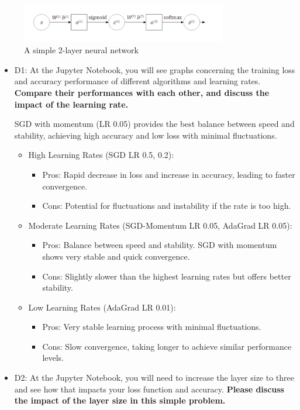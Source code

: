 \documentclass[12pt]{article}
\begin{document}
\begin{figure}[hbt]
	\centering
	\includegraphics[width=0.8\textwidth]{q3.png}
	\caption{A simple 2-layer neural network }
\end{figure}
\begin{itemize}
	\item D1: At the Jupyter Notebook, you will see graphs concerning the training loss and accuracy performance of different algorithms and learning rates. \textbf{Compare their performances with each other, and discuss the impact of the learning rate.}

	      SGD with momentum (LR 0.05) provides the best balance between speed and stability, achieving high accuracy and low loss with minimal fluctuations.

	      \begin{itemize}
		      \item High Learning Rates (SGD LR 0.5, 0.2):
		            \begin{itemize}
			            \item Pros: Rapid decrease in loss and increase in accuracy, leading to faster convergence.
			            \item Cons: Potential for fluctuations and instability if the rate is too high.
		            \end{itemize}
		      \item Moderate Learning Rates (SGD-Momentum LR 0.05, AdaGrad LR 0.05):
		            \begin{itemize}
			            \item Pros: Balance between speed and stability. SGD with momentum shows very stable and quick convergence.
			            \item Cons: Slightly slower than the highest learning rates but offers better stability.
		            \end{itemize}
		      \item Low Learning Rates (AdaGrad LR 0.01):
		            \begin{itemize}
			            \item Pros: Very stable learning process with minimal fluctuations.
			            \item Cons: Slow convergence, taking longer to achieve similar performance levels.
		            \end{itemize}
	      \end{itemize}
	\item D2: At the Jupyter Notebook, you will need to increase the layer size to three and see how that impacts your loss function and accuracy. \textbf{Please discuss the impact of the layer size in this simple problem.}


\end{itemize}
\end{document}
